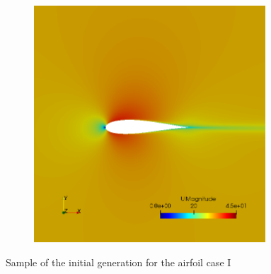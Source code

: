 \begin{figure}[h!]
\begin{subfigure}[t]{0.31\textwidth}
    \end{subfigure}
    \begin{subfigure}[t]{0.31\textwidth}
        \includegraphics[width=0.95\textwidth, height=0.17\textheight]{Figures/4/g0i55.png}
    \end{subfigure}
    \caption{Sample of the initial generation for the airfoil case I}
    \label{fig:initialCLCD}
\end{figure}


